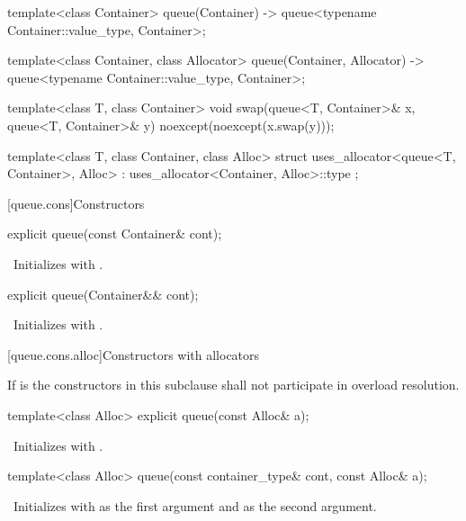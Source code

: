 \begin{codeblock}
\begin{codeblock}
{  template<class Container>
    queue(Container) -> queue<typename Container::value_type, Container>;

  template<class Container, class Allocator>
    queue(Container, Allocator) -> queue<typename Container::value_type, Container>;

  template<class T, class Container>
    void swap(queue<T, Container>& x, queue<T, Container>& y) noexcept(noexcept(x.swap(y)));

  template<class T, class Container, class Alloc>
    struct uses_allocator<queue<T, Container>, Alloc>
      : uses_allocator<Container, Alloc>::type { };
}
\end{codeblock}

[queue.cons]{Constructors}

\begin{itemdecl}
explicit queue(const Container& cont);
\end{itemdecl}

\begin{itemdescr}
\pnum
\effects\ Initializes  with .
\end{itemdescr}

\begin{itemdecl}
explicit queue(Container&& cont);
\end{itemdecl}

\begin{itemdescr}
\pnum
\effects\ Initializes  with .
\end{itemdescr}

[queue.cons.alloc]{Constructors with allocators}

\pnum
If  is 
the constructors in this subclause shall not participate in overload resolution.

\begin{itemdecl}
template<class Alloc> explicit queue(const Alloc& a);
\end{itemdecl}

\begin{itemdescr}
\pnum
\effects\ Initializes  with .
\end{itemdescr}

\begin{itemdecl}
template<class Alloc> queue(const container_type& cont, const Alloc& a);
\end{itemdecl}

\begin{itemdescr}
\pnum
\effects\ Initializes  with  as the first argument and 
as the second argument.
\end{itemdescr}


\end{codeblock}
